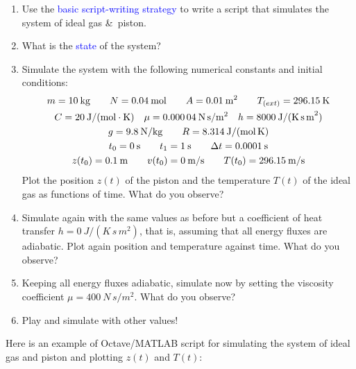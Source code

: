 \documentclass[a4paper,12pt,%
onecolumn,oneside,titlepage,%
british%
]{memoir}
\newcommand*{\amp}{\&}
\newcommand*{\incr}{\Delta}%
\renewcommand*{\|}[1][]{\nonscript\:#1\vert\nonscript\:\mathopen{}}
\newcommand*{\sect}{\S}%
\renewcommand*{\autoref}[2]{\sidepar{\vspace{-1ex}\footnotesize{\color{blue}\faIcon{%
reply%
}\enspace\sect\,\ref{#1} page\,\pageref{#1}}}\textcolor{blue}{#2}}
\newcommand*{\yN}{N}
\newcommand*{\yM}{m}%
\newcommand*{\yvis}{\mu}%
\newcommand*{\yhea}{h}%
\newcommand*{\yte}{T}%
\newcommand*{\ytee}{\yte_{\text(ext)}}%
\newcommand*{\yti}{t_{0}}
\newcommand*{\ytf}{t_{1}}
\newcommand*{\Dt}{\incr t}
\begin{document}
\begin{exercise}
  \begin{enumerate}[exerc]
  \item Use the \autoref{sec:strategy_simulation}{basic script-writing strategy} to write a script that simulates the system of ideal gas \amp\ piston.
  \item What is the \autoref{def:state}{state} of the system?
  \item Simulate the system with the following numerical constants and initial conditions:
    \begin{equation*}
      \begin{gathered}
        \yM = \qty{10}{kg}
        \qquad
        \yN = \qty{0.04}{mol}
        \qquad
        A = \qty{0.01}{m^{2}}
        \qquad
        \ytee = \qty{296.15}{K}
        \\
        C = \qty{20}{J/(mol\cdot K)}
        \quad
        \yvis = \qty{0.00004}{N\,s/m^{2}}
        \quad
        \yhea = \qty{8000}{J/(K\, s\, m^{2})}
        \\
        g = \qty{9.8}{N/kg}
        \qquad
        R = \qty{8.314}{J/(mol\, K)}
        \\
        \yti = \qty{0}{s}
        \qquad
        \ytf = \qty{1}{s}
        \qquad
        \Dt = \qty{0.0001}{s}
        \\
        z(\yti) = \qty{0.1}{m}
        \qquad
        v(\yti) = \qty{0}{m/s}
        \qquad
        T(\yti) = \qty{296.15}{m/s}
      \end{gathered}
    \end{equation*}
    Plot the position $z(t)$ of the piston and the temperature $\yte(t)$ of the ideal gas as functions of time. What do you observe?
  \item Simulate again with the same values as before but a coefficient of heat transfer $\yhea=\qty{0}{J/(K\,s\,m^{2})}$, that is, assuming that all energy fluxes are adiabatic. Plot again position and temperature against time. What do you observe?
  \item Keeping all energy fluxes adiabatic, simulate now by setting the viscosity coefficient $\yvis = \qty{400}{N\,s/m^{2}}$. What do you observe?

  \item Play and simulate with other values!
  \end{enumerate}
\end{exercise}

\bigskip

Here is an example of Octave/MATLAB script for simulating the system of ideal gas and piston and plotting $z(t)$ and $\yte(t)$:
\end{document}
